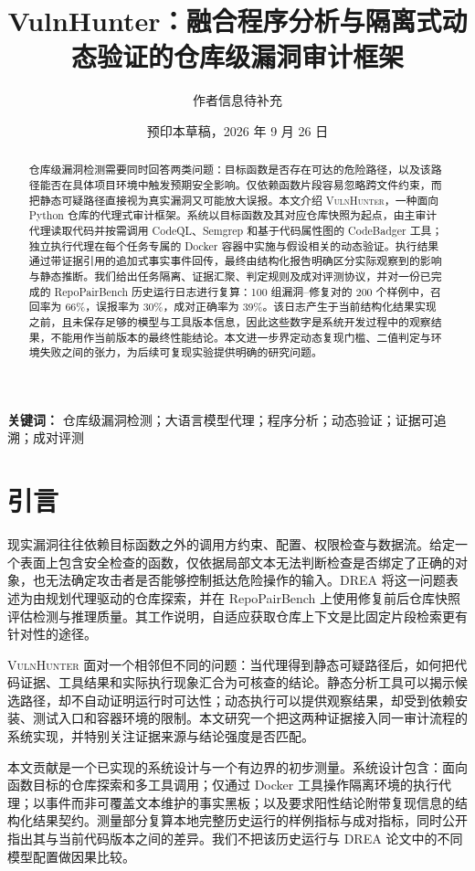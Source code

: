 \documentclass[UTF8,a4paper,11pt,fontset=fandol]{ctexart}
\title{VulnHunter：融合程序分析与隔离式动态验证的仓库级漏洞审计框架}
\author{作者信息待补充}
\date{预印本草稿，2026 年 9 月 26 日}
\newcommand{\VH}{\textsc{VulnHunter}}
\newcommand{\DREA}{\textsc{DREA}}
\begin{document}
\maketitle

\begin{abstract}
仓库级漏洞检测需要同时回答两类问题：目标函数是否存在可达的危险路径，以及该路径能否在具体项目环境中触发预期安全影响。仅依赖函数片段容易忽略跨文件约束，而把静态可疑路径直接视为真实漏洞又可能放大误报。本文介绍 \VH{}，一种面向 Python 仓库的代理式审计框架。系统以目标函数及其对应仓库快照为起点，由主审计代理读取代码并按需调用 CodeQL、Semgrep 和基于代码属性图的 CodeBadger 工具；独立执行代理在每个任务专属的 Docker 容器中实施与假设相关的动态验证。执行结果通过带证据引用的追加式事实事件回传，最终由结构化报告明确区分实际观察到的影响与静态推断。我们给出任务隔离、证据汇聚、判定规则及成对评测协议，并对一份已完成的 RepoPairBench 历史运行日志进行复算：100 组漏洞--修复对的 200 个样例中，召回率为 66\%，误报率为 30\%，成对正确率为 39\%。该日志产生于当前结构化结果实现之前，且未保存足够的模型与工具版本信息，因此这些数字是系统开发过程中的观察结果，不能用作当前版本的最终性能结论。本文进一步界定动态复现门槛、二值判定与环境失败之间的张力，为后续可复现实验提供明确的研究问题。
\end{abstract}

\noindent\textbf{关键词：} 仓库级漏洞检测；大语言模型代理；程序分析；动态验证；证据可追溯；成对评测

\section{引言}
现实漏洞往往依赖目标函数之外的调用方约束、配置、权限检查与数据流。给定一个表面上包含安全检查的函数，仅依据局部文本无法判断检查是否绑定了正确的对象，也无法确定攻击者是否能够控制抵达危险操作的输入。\DREA{} 将这一问题表述为由规划代理驱动的仓库探索，并在 RepoPairBench 上使用修复前后仓库快照评估检测与推理质量\cite{drea2026}。其工作说明，自适应获取仓库上下文是比固定片段检索更有针对性的途径。

\VH{} 面对一个相邻但不同的问题：当代理得到静态可疑路径后，如何把代码证据、工具结果和实际执行现象汇合为可核查的结论。静态分析工具可以揭示候选路径，却不自动证明运行时可达性；动态执行可以提供观察结果，却受到依赖安装、测试入口和容器环境的限制。本文研究一个把这两种证据接入同一审计流程的系统实现，并特别关注证据来源与结论强度是否匹配。

本文贡献是一个已实现的系统设计与一个有边界的初步测量。系统设计包含：面向函数目标的仓库探索和多工具调用；仅通过 Docker 工具操作隔离环境的执行代理；以事件而非可覆盖文本维护的事实黑板；以及要求阳性结论附带复现信息的结构化结果契约。测量部分复算本地完整历史运行的样例指标与成对指标，同时公开指出其与当前代码版本之间的差异。我们不把该历史运行与 \DREA{} 论文中的不同模型配置做因果比较。
\end{document}
